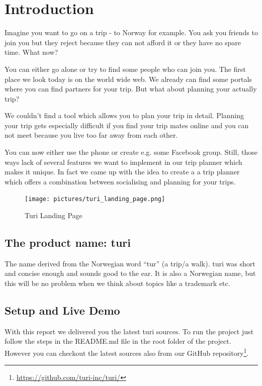 \documentclass[a4paper]{article}
\begin{document}
\tableofcontents
\pagebreak


\section{Introduction}
Imagine you want to go on a trip - to Norway for example. You ask you friends to join you but they reject because they can not afford it or they have no spare time. What now?

You can either go alone or try to find some people who can join you. The first place we look today is on the world wide web. We already can find some portals where you can find partners for your trip. But what about planning your actually trip?

We couldn’t find a tool which allows you to plan your trip in detail. Planning your trip gets especially difficult if you find your trip mates online and you can not meet because you live too far away from each other. 

You can now either use the phone or create e.g. some Facebook group. Still, those ways lack of several features we want to implement in our trip planner which makes it unique. In fact we came up with the idea to create a a trip planner which offers a combination between socialising and planning for your trips.\\

\begin{figure}[!h]
  \begin{center}
    \texttt{[image: pictures/turi\_landing\_page.png]}
  \end{center}
\caption{Turi Landing Page}
\label{fig:turilandingpage}
\end{figure}

\subsection{The product name: turi}
The name derived from the Norwegian word “tur” (a trip/a walk). turi was short and concise enough and sounds good to the ear. It is also a Norwegian name, but this will be no problem when we think about topics like a trademark etc.

\subsection{Setup and Live Demo}

With this report we delivered you the latest turi sources. To run the project just follow the steps in the README.md file in the root folder of the project. However you can checkout the latest sources also from our GitHub repository\footnote{\url{https://github.com/turi-inc/turi/}}.\\
\end{document}
